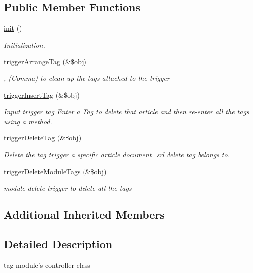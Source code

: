 \subsection*{Public Member Functions}
\begin{DoxyCompactItemize}
\item 
\hyperlink{classtagController_ada37b0f9e302b94d20dcc5f7168afb3b}{init} ()
\begin{DoxyCompactList}\small\item\em Initialization. \end{DoxyCompactList}\item 
\hyperlink{classtagController_a22edcccfa0ab6967230adf5a3d1bab27}{trigger\+Arrange\+Tag} (\&\$obj)
\begin{DoxyCompactList}\small\item\em , (Comma) to clean up the tags attached to the trigger \end{DoxyCompactList}\item 
\hyperlink{classtagController_ae17dc9d2d9f4d1193c4bb76e2296a060}{trigger\+Insert\+Tag} (\&\$obj)
\begin{DoxyCompactList}\small\item\em Input trigger tag Enter a Tag to delete that article and then re-\/enter all the tags using a method. \end{DoxyCompactList}\item 
\hyperlink{classtagController_a10bdcf92aea9f67d9c827d910e4454c9}{trigger\+Delete\+Tag} (\&\$obj)
\begin{DoxyCompactList}\small\item\em Delete the tag trigger a specific article document\+\_\+srl delete tag belongs to. \end{DoxyCompactList}\item 
\hyperlink{classtagController_a923a01c674ed2ad08b6e25e88f1001cf}{trigger\+Delete\+Module\+Tags} (\&\$obj)
\begin{DoxyCompactList}\small\item\em module delete trigger to delete all the tags \end{DoxyCompactList}\end{DoxyCompactItemize}
\subsection*{Additional Inherited Members}


\subsection{Detailed Description}
tag module's controller class 

